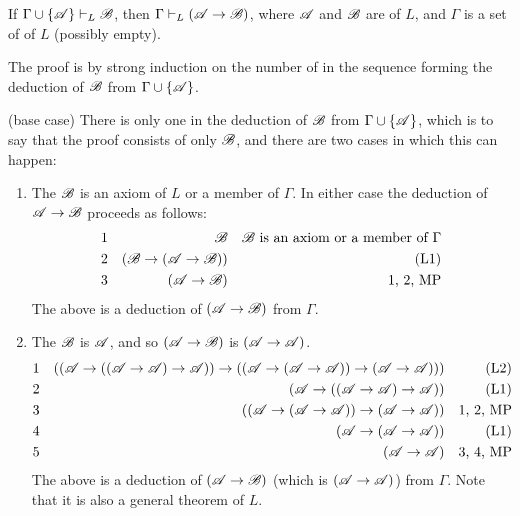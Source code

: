 \setcounter{definition}{7}
\begin{proposition}
  If \(\Gamma \cup \{\mathscr{A}\} \vdash_{L} \mathscr{B}\), then \(\Gamma \vdash_{L} (\mathscr{A} \rightarrow \mathscr{B})\), where \(\mathscr{A}\) and \(\mathscr{B}\) are \wfs{} of \(L\), and \(\Gamma\) is a set of \wfs{} of \(L\) (possibly empty).

  \prf{} The proof is by strong induction on the number of \wfs{} in the sequence forming the deduction of \(\mathscr{B}\) from \(\Gamma \cup \{\mathscr{A}\}\).

  (base case) There is only one \wf{} in the deduction of \(\mathscr{B}\) from \(\Gamma \cup \{\mathscr{A}\}\), which is to say that the proof consists of only \(\mathscr{B}\), and there are two cases in which this can happen:
  \begin{enumerate}
    \item The \wf{} \(\mathscr{B}\) is an axiom of \(L\) or a member of \(\Gamma\). In either case the deduction of \(\mathscr{A} \rightarrow \mathscr{B}\) proceeds as follows:
      \begin{align*}
        \text{1}&&
        \mathscr{B}&&
        \text{\(\ensuremath\mathscr{B}\) is an axiom or a member of \(\Gamma\)}\\
        \text{2}&&
        (\mathscr{B} \rightarrow (\mathscr{A} \rightarrow \mathscr{B}))&&
        \text{(L1)}\\
        \text{3}&&
        (\mathscr{A} \rightarrow \mathscr{B})&&
        \text{1, 2, MP}
      \end{align*}
      The above is a deduction of \((\mathscr{A} \rightarrow \mathscr{B})\) from \(\Gamma\).

    \item The \wf{} \(\mathscr{B}\) is \(\mathscr{A}\), and so \((\mathscr{A} \rightarrow \mathscr{B})\) is \((\mathscr{A} \rightarrow \mathscr{A})\). 
      \begin{align*}
        \text{1}&&
        ((\mathscr{A} \rightarrow ((\mathscr{A} \rightarrow \mathscr{A}) \rightarrow \mathscr{A})) \rightarrow ((\mathscr{A} \rightarrow (\mathscr{A} \rightarrow \mathscr{A})) \rightarrow (\mathscr{A} \rightarrow \mathscr{A})))&&
        \text{(L2)}\\
        \text{2}&&
        (\mathscr{A} \rightarrow ((\mathscr{A} \rightarrow \mathscr{A}) \rightarrow \mathscr{A}))&&
        \text{(L1)}\\
        \text{3}&&
        ((\mathscr{A} \rightarrow (\mathscr{A} \rightarrow \mathscr{A})) \rightarrow (\mathscr{A} \rightarrow \mathscr{A}))&&
        \text{1, 2, MP}\\
        \text{4}&&
        (\mathscr{A} \rightarrow (\mathscr{A} \rightarrow \mathscr{A}))&&
        \text{(L1)}\\
        \text{5}&&
        (\mathscr{A} \rightarrow \mathscr{A})&&
        \text{3, 4, MP}
      \end{align*}
      The above is a deduction of \((\mathscr{A} \rightarrow \mathscr{B})\) (which is \((\mathscr{A} \rightarrow \mathscr{A})\)) from \(\Gamma\). Note that it is also a general theorem of \(L\).
  \end{enumerate}


\end{proposition}
